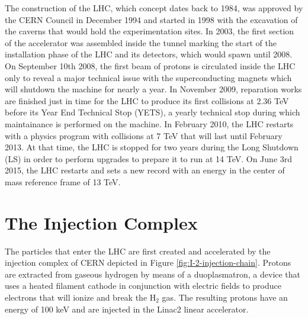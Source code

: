   The construction of the LHC, which concept dates back to 1984, was approved by the CERN Council in December 1994 and started in 1998 with the excavation of the caverns that would hold the experimentation sites. In 2003, the first section of the accelerator was assembled inside the tunnel marking the start of the installation phase of the LHC and its detectors, which would spawn until 2008. On September 10th 2008, the first beam of protons is circulated inside the LHC only to reveal a major technical issue with the superconducting magnets which will shutdown the machine for nearly a year. In November 2009, reparation works are finished just in time for the LHC to produce its first collisions at 2.36 TeV before its Year End Technical Stop (YETS), a yearly technical stop during which maintainance is performed on the machine. In February 2010, the LHC restarts with a physics program with collisions at 7 TeV that will last until February 2013. At that time, the LHC is stopped for two years during the Long Shutdown (LS) in order to perform upgrades to prepare it to run at 14 TeV. On June 3rd 2015, the LHC restarts and sets a new record with an energy in the center of mass reference frame of 13 TeV.

  \section{The Injection Complex}

    The particles that enter the LHC are first created and accelerated by the injection complex of CERN depicted in Figure \ref{fig:I-2-injection-chain}. Protons are extracted from gaseous hydrogen by means of a duoplasmatron, a device that uses a heated filament cathode in conjunction with electric fields to produce electrons that will ionize and break the H$_2$ gas. The resulting protons have an energy of 100 keV and are injected in the Linac2 linear accelerator. \\

